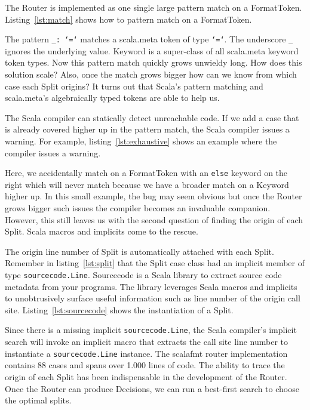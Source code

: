 The Router is implemented as one single large pattern match on a FormatToken.
Listing~\ref{lst:match} shows how to pattern match on a FormatToken.

The pattern \texttt{\_: `=`} matches a scala.meta token of type \texttt{`=`}.
The underscore \texttt{\_} ignores the underlying value.
Keyword is a super-class of all scala.meta keyword token types.
Now this pattern match quickly grows unwieldy long.
How does this solution scale?
Also, once the match grows bigger how can we know from which case each Split origins?
It turns out that Scala's pattern matching and scala.meta's algebraically typed tokens are able to help us.

The Scala compiler can statically detect unreachable code.
If we add a case that is already covered higher up in the pattern match, the Scala compiler issues a warning.
For example, listing~\ref{lst:exhaustive} shows an example where the compiler issues a warning.

Here, we accidentally match on a FormatToken with an \texttt{else} keyword on the right which will never match because we have a broader match on a Keyword higher up.
In this small example, the bug may seem obvious but once the Router grows bigger such issues the compiler becomes an invaluable companion.
However, this still leaves us with the second question of finding the origin of each Split.
Scala macros and implicits come to the rescue.

The origin line number of Split is automatically attached with each Split.
Remember in listing~\ref{lst:split} that the Split case class had an implicit member of type \texttt{sourcecode.Line}.
Sourcecode\autocite{lihao91:online} is a Scala library to extract source code metadata from your programs.
The library leverages Scala macros and implicits to unobtrusively surface useful information such as line number of the origin call site.
Listing~\ref{lst:sourcecode} shows the instantiation of a Split.

Since there is a missing implicit \texttt{sourcecode.Line}, the Scala compiler's implicit search will invoke an implicit macro that extracts the call site line number to instantiate a \texttt{sourcecode.Line} instance.
The scalafmt router implementation contains 88 cases and spans over 1.000 lines of code.
The ability to trace the origin of each Split has been indispensable in the development of the Router.
Once the Router can produce Decisions, we can run a best-first search to choose the optimal splits.

